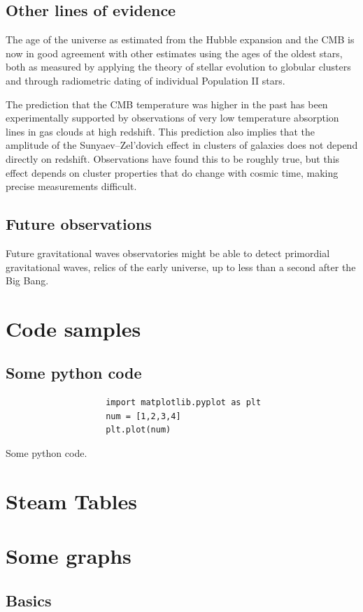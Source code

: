 \documentclass[14pt, oneside]{book}
\begin{document}
		\section{Other lines of evidence}
			The age of the universe as estimated from the Hubble expansion and the CMB is now in good agreement with other estimates using the ages of the oldest stars, both as measured by applying the theory of stellar evolution to globular clusters and through radiometric dating of individual Population II stars.
			
			The prediction that the CMB temperature was higher in the past has been experimentally supported by observations of very low temperature absorption lines in gas clouds at high redshift. This prediction also implies that the amplitude of the Sunyaev–Zel'dovich effect in clusters of galaxies does not depend directly on redshift. Observations have found this to be roughly true, but this effect depends on cluster properties that do change with cosmic time, making precise measurements difficult.
			
		\section{Future observations}
			Future gravitational waves observatories might be able to detect primordial gravitational waves, relics of the early universe, up to less than a second after the Big Bang. 

	\chapter{Code samples}
		\section{Some python code}
			\begin{listing}[H]
				\centering
				\begin{verbatim}
					import matplotlib.pyplot as plt
					num = [1,2,3,4]
					plt.plot(num)
				\end{verbatim}
				\caption{Some python code.}
				\label{lst:python}
			\end{listing}
	
	\chapter{Steam Tables}
		
	
	\chapter{Some graphs}
		\section{Basics}

	
	
\end{document}
